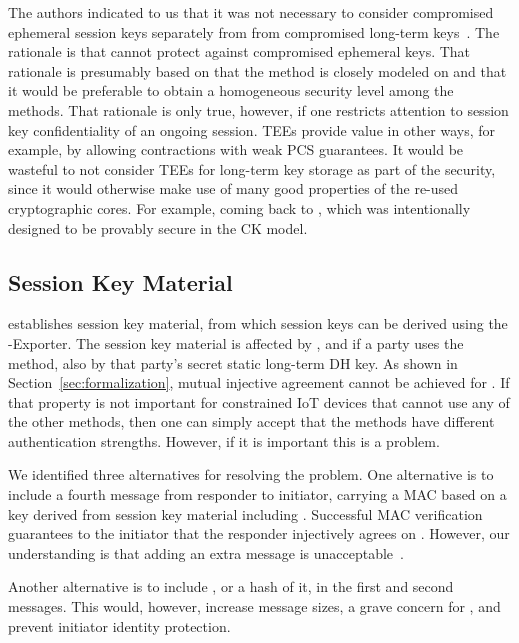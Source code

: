 \documentclass[runningheads, envcountsame, a4paper, draft, x11names]{llncs}
\begin{document}
The \mEdhoc{} authors indicated to us that it was
not necessary to consider compromised ephemeral session keys separately from
from compromised long-term keys~\cite{personalCommunication}.
%
The rationale is that \mSigma{} cannot protect against compromised ephemeral
keys.
%
That rationale is presumably based on that the \mSigSig{} method is
closely modeled on \mSigmaI{} and that it would be preferable to obtain a
homogeneous security level among the \mEdhoc{}
methods\cite{personalCommunication}.
%
That rationale is only true, however, if one restricts attention to session key
confidentiality of an ongoing session.
%
TEEs provide value in other ways, for example, by allowing contractions with
weak PCS guarantees.
%
It would be wasteful to not consider TEEs for long-term key storage as part of
the security, since it would otherwise make use of many good properties of the
re-used cryptographic cores.
%
For example, coming back to \mOptls{}, which was intentionally
designed to be provably secure in the CK model.
%

\subsection{Session Key Material}
\label{sec:sessionKeyMaterial}
\mEdhoc{} establishes session key material, from which session keys
can be derived using the \mEdhoc{}-Exporter.
%
The session key material is affected by \mGxy{}, and if a party uses the
\mStat{} method, also by that party's secret static long-term DH key.
%
As shown in Section~\ref{sec:formalization}, mutual injective agreement cannot
be achieved for \mGiy{}.
%
If that property is not important for constrained IoT devices that cannot use
any of the other methods, then one can simply accept that the methods have
different authentication strengths.
%
However, if it is important this is a problem.
%

We identified three alternatives for resolving the problem.
%
One alternative is to include a fourth message from responder to initiator,
carrying a MAC based on a key derived from session key
material including \mGiy{}.
%
Successful MAC verification guarantees
to the initiator that the responder injectively agrees on \mGiy{}.
%
However, our understanding is that adding an extra message is
unacceptable~\cite{personalCommunication}.
%

Another alternative is to include \mGi{}, or a hash of it, in the first and
second messages.
%
This would, however, increase message sizes, a grave concern for \mEdhoc{},
and prevent initiator identity protection.
%
\end{document}
